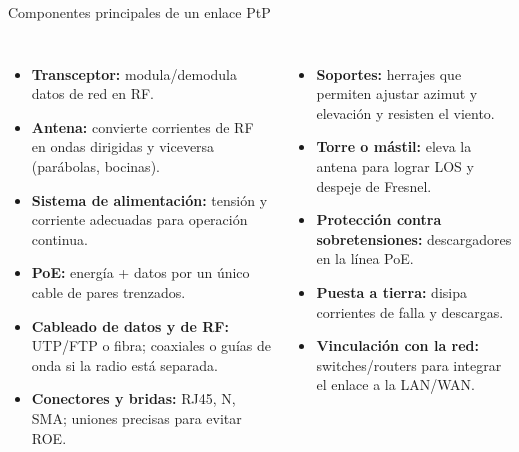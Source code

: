 \begin{frame}{Componentes principales de un enlace PtP}
  \small
  \begin{columns}[T]
    \begin{itemize}
      \item \textbf{Transceptor:} modula/demodula datos de red en RF.
      \item \textbf{Antena:} convierte corrientes de RF en ondas dirigidas y viceversa (parábolas, bocinas).
      \item \textbf{Sistema de alimentación:} tensión y corriente adecuadas para operación continua.
      \item \textbf{PoE:} energía + datos por un único cable de pares trenzados.
      \item \textbf{Cableado de datos y de RF:} UTP/FTP o fibra; coaxiales o guías de onda si la radio está separada.
      \item \textbf{Conectores y bridas:} RJ45, N, SMA; uniones precisas para evitar ROE.
    \end{itemize}
    \begin{itemize}
      \item \textbf{Soportes:} herrajes que permiten ajustar azimut y elevación y resisten el viento.
      \item \textbf{Torre o mástil:} eleva la antena para lograr LOS y despeje de Fresnel.
      \item \textbf{Protección contra sobretensiones:} descargadores en la línea PoE.
      \item \textbf{Puesta a tierra:} disipa corrientes de falla y descargas.
      \item \textbf{Vinculación con la red:} switches/routers para integrar el enlace a la LAN/WAN.
    \end{itemize}
  \end{columns}
\end{frame}

